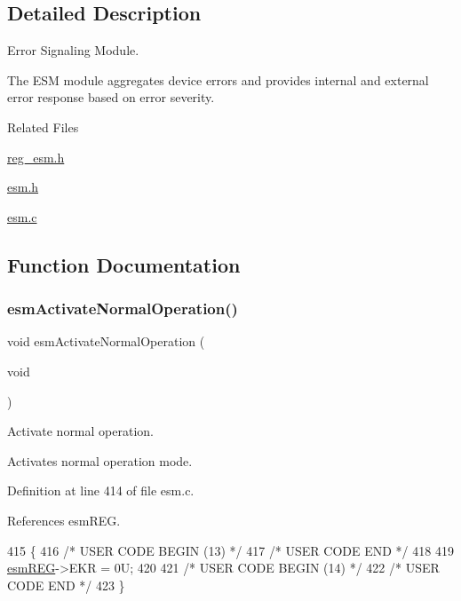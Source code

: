 \subsection{Detailed Description}
Error Signaling Module. 

The E\+SM module aggregates device errors and provides internal and external error response based on error severity.

Related Files
\begin{DoxyItemize}
\item \mbox{\hyperlink{reg__esm_8h}{reg\+\_\+esm.\+h}}
\item \mbox{\hyperlink{esm_8h}{esm.\+h}}
\item \mbox{\hyperlink{esm_8c}{esm.\+c}} 
\end{DoxyItemize}

\subsection{Function Documentation}
\mbox{\label{group__ESM_ga9c80550059c5da2e680f73c5c06603b5}} 
\subsubsection{\texorpdfstring{esm\+Activate\+Normal\+Operation()}{esmActivateNormalOperation()}}
{\footnotesize\ttfamily void esm\+Activate\+Normal\+Operation (\begin{DoxyParamCaption}\item[{void}]{ }\end{DoxyParamCaption})}



Activate normal operation. 

Activates normal operation mode. 

Definition at line 414 of file esm.\+c.



References esm\+R\+EG.


\begin{DoxyCode}
415 \{
416 \textcolor{comment}{/* USER CODE BEGIN (13) */}
417 \textcolor{comment}{/* USER CODE END */}
418 
419     \mbox{\hyperlink{reg__esm_8h_a7c2e779f2973e0c2c9496a4796df10f1}{esmREG}}->EKR = 0U;
420 
421 \textcolor{comment}{/* USER CODE BEGIN (14) */}
422 \textcolor{comment}{/* USER CODE END */}
423 \}
\end{DoxyCode}
\mbox{\label{group__ESM_ga437032c8dd6a0855da7e8102d4143a0a}} 
